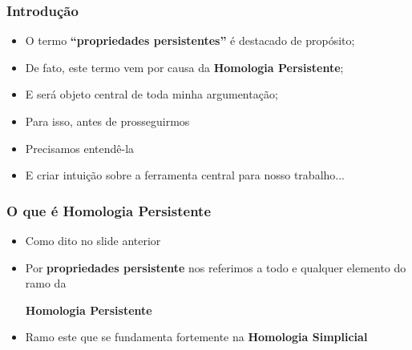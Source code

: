 \documentclass[11pt]{beamer}
\theoremstyle{remark}
\theoremstyle{definition}
\theoremstyle{plain}
\begin{document}
    \begin{frame}
        \frametitle{Introdução}
        \begin{itemize}
            \item
                O termo \textbf{``propriedades persistentes''} 
                é destacado de propósito;

            \item 
                De fato, este termo vem por causa da \textbf{Homologia
                Persistente};

            \item 
                E será objeto central de toda minha argumentação;

            \item Para isso, antes de prosseguirmos 

            \item Precisamos entendê-la

            \item E criar intuição sobre a ferramenta central para nosso
                trabalho...
        \end{itemize}
    \end{frame}

    \begin{frame}
        \frametitle{O que é Homologia Persistente}
        \begin{itemize}
            \item 
                Como dito no slide anterior

            \item 
                Por \textbf{propriedades persistente} nos referimos
                a todo e qualquer elemento do ramo da
                \begin{center}
                    \textbf{Homologia Persistente}
                \end{center}

            \item 
                Ramo este que se fundamenta fortemente na
                \textbf{Homologia Simplicial} \\[1cm]

        \end{itemize}
    \end{frame}
\end{document}
